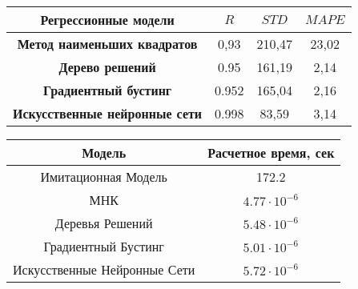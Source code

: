 \begin{frame}
    \justifying

    \fontsize{8pt}{7.2}\selectfont

    \begin{table}[b]\label{tab:total_reg_metrics}
        \begin{tabular}{|c|ccc|}
            \toprule
            Регрессионные модели    &$R$    & $STD$    &   $MAPE$\\
        
            \midrule
            \textbf{Метод наименьших квадратов} & 0,93   &   210,47  &   23,02 \\
            \textbf{Дерево решений} & 0.95   &   161,19  &   2,14 \\
            \textbf{Градиентный бустинг} & 0.952   &   165,04  &   2,16  \\
            \textbf{Искусственные нейронные сети} & 0.998   &   83,59  &   3,14  \\
            \bottomrule
        \end{tabular}
    \end{table}

    \begin{table}
        
        \begin{tabular}{|cc|}
            \toprule
            \textbf{Модель} & \textbf{Расчетное время, сек} \\
            \toprule
            Имитационная Модель & 172.2 \\
            МНК & $4.77\cdot 10^{-6}$  \\
            Деревья Решений & $5.48\cdot 10^{-6}$ \\
            Градиентный Бустинг & $5.01\cdot 10^{-6}$  \\
            Искусственные Нейронные Сети & $5.72\cdot 10^{-6}$ \\
    
    
            \bottomrule
        \end{tabular}
    \end{table}
\end{frame}


